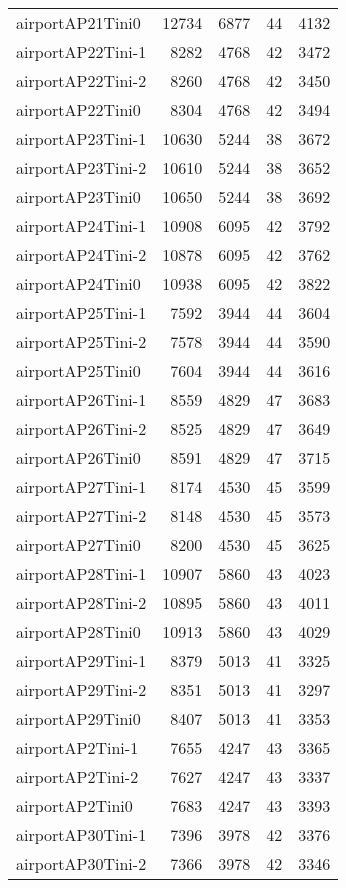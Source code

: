 \begin{longtable}{lrrrr}
airportAP21Tini0 & 12734 & 6877 & 44 & 4132 \\
airportAP22Tini-1 & 8282 & 4768 & 42 & 3472 \\
airportAP22Tini-2 & 8260 & 4768 & 42 & 3450 \\
airportAP22Tini0 & 8304 & 4768 & 42 & 3494 \\
airportAP23Tini-1 & 10630 & 5244 & 38 & 3672 \\
airportAP23Tini-2 & 10610 & 5244 & 38 & 3652 \\
airportAP23Tini0 & 10650 & 5244 & 38 & 3692 \\
airportAP24Tini-1 & 10908 & 6095 & 42 & 3792 \\
airportAP24Tini-2 & 10878 & 6095 & 42 & 3762 \\
airportAP24Tini0 & 10938 & 6095 & 42 & 3822 \\
airportAP25Tini-1 & 7592 & 3944 & 44 & 3604 \\
airportAP25Tini-2 & 7578 & 3944 & 44 & 3590 \\
airportAP25Tini0 & 7604 & 3944 & 44 & 3616 \\
airportAP26Tini-1 & 8559 & 4829 & 47 & 3683 \\
airportAP26Tini-2 & 8525 & 4829 & 47 & 3649 \\
airportAP26Tini0 & 8591 & 4829 & 47 & 3715 \\
airportAP27Tini-1 & 8174 & 4530 & 45 & 3599 \\
airportAP27Tini-2 & 8148 & 4530 & 45 & 3573 \\
airportAP27Tini0 & 8200 & 4530 & 45 & 3625 \\
airportAP28Tini-1 & 10907 & 5860 & 43 & 4023 \\
airportAP28Tini-2 & 10895 & 5860 & 43 & 4011 \\
airportAP28Tini0 & 10913 & 5860 & 43 & 4029 \\
airportAP29Tini-1 & 8379 & 5013 & 41 & 3325 \\
airportAP29Tini-2 & 8351 & 5013 & 41 & 3297 \\
airportAP29Tini0 & 8407 & 5013 & 41 & 3353 \\
airportAP2Tini-1 & 7655 & 4247 & 43 & 3365 \\
airportAP2Tini-2 & 7627 & 4247 & 43 & 3337 \\
airportAP2Tini0 & 7683 & 4247 & 43 & 3393 \\
airportAP30Tini-1 & 7396 & 3978 & 42 & 3376 \\
airportAP30Tini-2 & 7366 & 3978 & 42 & 3346 \\

\end{longtable}
